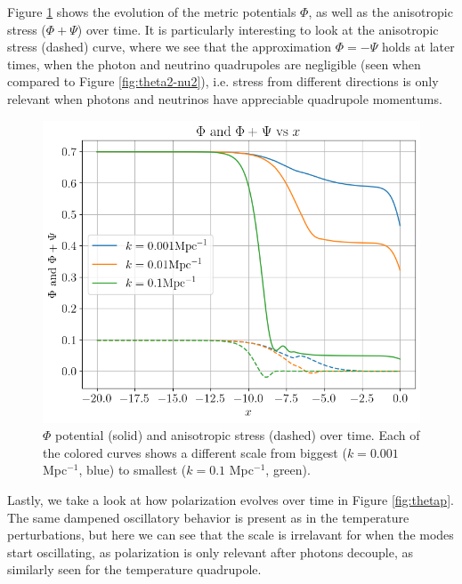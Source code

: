 \documentclass{aa}
\begin{document}
Figure \ref{fig:potentials} shows the evolution of the metric potentials $\Phi$, as well as the anisotropic stress ($\Phi +\Psi$) over time. It is particularly interesting to look at the anisotropic stress (dashed) curve, where we see that the approximation $\Phi = - \Psi$ holds at later times, when the photon and neutrino quadrupoles are negligible (seen when compared to Figure \ref{fig:theta2-nu2}), i.e. stress from different directions is only relevant when photons and neutrinos have appreciable quadrupole momentums.

\begin{figure}[ht]
    \centering
    \includegraphics[width=\hsize]{report/figures/Phi_Psi.png}
    \caption{$\Phi$ potential (solid) and anisotropic stress (dashed) over time. Each of the colored curves shows a different scale from biggest ($k = 0.001$ Mpc$^{-1}$, blue) to smallest ($k=0.1$ Mpc$^{-1}$, green).}
    \label{fig:potentials}
\end{figure}

Lastly, we take a look at how polarization evolves over time in Figure \ref{fig:thetap}. The same dampened oscillatory behavior is present as in the temperature perturbations, but here we can see that the scale is irrelavant for when the modes start oscillating, as polarization is only relevant after photons decouple, as similarly seen for the temperature quadrupole.
\end{document}
